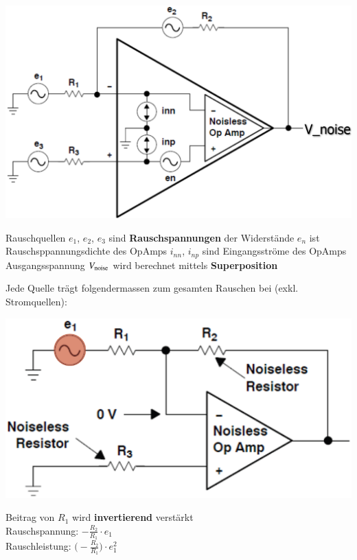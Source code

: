\begin{minipage}[c]{0.4\columnwidth}
    \includegraphics[width=\columnwidth]{images/rauschen_opamp.png}
\end{minipage}
\hfill
\begin{minipage}[c]{0.58\columnwidth}
    \begin{outline}
         Rauschquellen 
            \2 $e_1$, $e_2$, $e_3$ sind \textbf{Rauschspannungen} der Widerstände
            \2 $e_n$ ist Rauschsppannungsdichte des OpAmps
            \2 $i_{nn}$, $i_{np}$ sind Eingangsströme des OpAmps
        \1 Ausgangsspannung $V_{\rm noise}$ wird berechnet mittels \textbf{Superposition}
    \end{outline}
\end{minipage}


Jede Quelle trägt folgendermassen zum gesamten Rauschen bei (exkl. Stromquellen):

\begin{minipage}[c]{0.4\columnwidth}
    \includegraphics[width=\columnwidth]{images/rauschen_opamp_R1.png}
\end{minipage}
\hfill
\begin{minipage}[c]{0.4\columnwidth}
    Beitrag von $R_1$ wird \textbf{invertierend} verstärkt \\

    Rauschspannung: $ - \frac{R_2}{R_1} \cdot e_1$ \\
    Rauschleistung: $ \bigl(- \frac{R_2}{R_1} \bigr) \cdot e_1^2$
\end{minipage}


